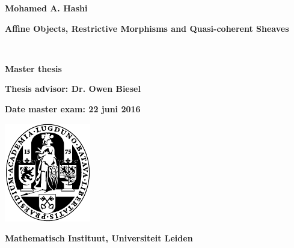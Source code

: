 \thispagestyle{empty}
\vspace*{7em}

\begin{center}

{\large\textbf{Mohamed A. Hashi}\par} \vspace{3em} {\LARGE \textbf{Affine Objects, Restrictive Morphisms and Quasi-coherent Sheaves}\par} \
\vspace{3em} 

{\large\textbf{Master thesis}\par} \vspace{1em} {\large\textbf{Thesis advisor: Dr. Owen Biesel} \par} \vspace{3em} 
{\large\textbf{Date master exam: 22 juni 2016}\par}\vfill

\includegraphics{ulzegel.pdf}\\

\vspace{2em}

{\large\textbf{Mathematisch Instituut, Universiteit Leiden}}

\end{center}